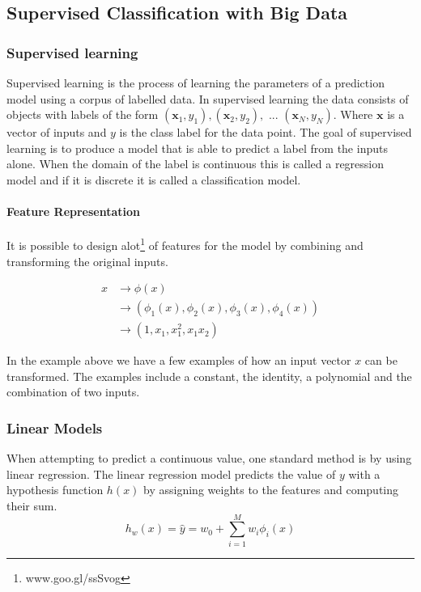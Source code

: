 \subsection{Supervised Classification with Big Data}


\subsubsection{Supervised learning}
Supervised learning is the process of learning the parameters of a prediction model using a corpus of labelled data.
In supervised learning the data consists of objects with labels of the form 
$(\textbf{x}_1,y_1),(\textbf{x}_2,y_2), \text{ ... } (\textbf{x}_N,y_N)$.
Where $\textbf{x}$ is a vector of inputs and $y$ is the class label for the data point.
The goal of supervised learning is to produce a model that is able to predict a label from the inputs alone.
When the domain of the label is continuous this is called a regression model and if it is discrete it is called a classification model.

\paragraph{Feature Representation}\label{sec:phi}
It is possible to design alot\footnote{www.goo.gl/ssSvog} of features for the model by combining and transforming the original inputs.

\begin{align*}
x &\rightarrow \phi(x) \\
&\rightarrow (\phi_1(x), \phi_2(x), \phi_3(x), \phi_4(x)) \\
&\rightarrow (1, x_1, x_1^2, x_1x_2)
\end{align*} 

In the example above we have a few examples of how an input vector $x$ can be transformed.
The examples include a constant, the identity, a polynomial and the combination of two inputs.

\subsubsection{Linear Models}

When attempting to predict a continuous value, one standard method is by using linear regression.
The linear regression model predicts the value of $y$ with a hypothesis function $h(x)$ by assigning weights to the features and computing their sum.
$$h_w(x) = \hat{y} = w_0 + \sum_{i=1}^M w_i \phi_i(x)$$ 

